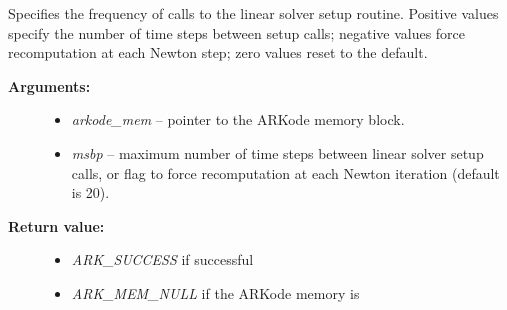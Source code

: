 \documentclass[letterpaper,10pt,english]{sphinxmanual}
\begin{document}
\begin{fulllineitems}
\label{c_interface/User_callable:c.ARKodeSetMaxStepsBetweenLSet}
Specifies the frequency of calls to the linear solver setup
routine.  Positive values specify the number of time steps between
setup calls; negative values force recomputation at each Newton
step; zero values reset to the default.
\begin{description}
\item[{\textbf{Arguments:}}] \leavevmode\begin{itemize}
\item {} 
\emph{arkode\_mem} -- pointer to the ARKode memory block.

\item {} 
\emph{msbp} -- maximum number of time steps between linear solver
setup calls, or flag to force recomputation at each Newton
iteration (default is 20).

\end{itemize}

\item[{\textbf{Return value:}}] \leavevmode\begin{itemize}
\item {} 
\emph{ARK\_SUCCESS} if successful

\item {} 
\emph{ARK\_MEM\_NULL} if the ARKode memory is 

\end{itemize}

\end{description}

\end{fulllineitems}

\end{document}
